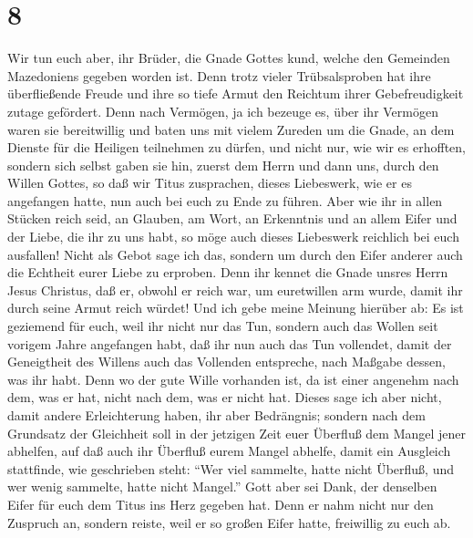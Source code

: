 \hypertarget{section-7}{%
\section{8}\label{section-7}}

 Wir tun euch aber, ihr Brüder, die Gnade Gottes kund,
welche den Gemeinden Mazedoniens gegeben worden ist.  Denn
trotz vieler Trübsalsproben hat ihre überfließende Freude und ihre so
tiefe Armut den Reichtum ihrer Gebefreudigkeit zutage gefördert.
 Denn nach Vermögen, ja ich bezeuge es, über ihr Vermögen
waren sie bereitwillig  und baten uns mit vielem Zureden
um die Gnade, an dem Dienste für die Heiligen teilnehmen zu dürfen,
 und nicht nur, wie wir es erhofften, sondern sich selbst
gaben sie hin, zuerst dem Herrn und dann uns, durch den Willen Gottes,
 so daß wir Titus zusprachen, dieses Liebeswerk, wie er es
angefangen hatte, nun auch bei euch zu Ende zu führen. 
Aber wie ihr in allen Stücken reich seid, an Glauben, am Wort, an
Erkenntnis und an allem Eifer und der Liebe, die ihr zu uns habt, so
möge auch dieses Liebeswerk reichlich bei euch ausfallen! 
Nicht als Gebot sage ich das, sondern um durch den Eifer anderer auch
die Echtheit eurer Liebe zu erproben.  Denn ihr kennet die
Gnade unsres Herrn Jesus Christus, daß er, obwohl er reich war, um
euretwillen arm wurde, damit ihr durch seine Armut reich würdet!
 Und ich gebe meine Meinung hierüber ab: Es ist geziemend
für euch, weil ihr nicht nur das Tun, sondern auch das Wollen seit
vorigem Jahre angefangen habt,  daß ihr nun auch das Tun
vollendet, damit der Geneigtheit des Willens auch das Vollenden
entspreche, nach Maßgabe dessen, was ihr habt.  Denn wo
der gute Wille vorhanden ist, da ist einer angenehm nach dem, was er
hat, nicht nach dem, was er nicht hat.  Dieses sage ich
aber nicht, damit andere Erleichterung haben, ihr aber Bedrängnis;
sondern nach dem Grundsatz der Gleichheit soll in der jetzigen Zeit euer
Überfluß dem Mangel jener abhelfen,  auf daß auch ihr
Überfluß eurem Mangel abhelfe, damit ein Ausgleich stattfinde,
 wie geschrieben steht: ``Wer viel sammelte, hatte nicht
Überfluß, und wer wenig sammelte, hatte nicht Mangel.'' 
Gott aber sei Dank, der denselben Eifer für euch dem Titus ins Herz
gegeben hat.  Denn er nahm nicht nur den Zuspruch an,
sondern reiste, weil er so großen Eifer hatte, freiwillig zu euch ab.

